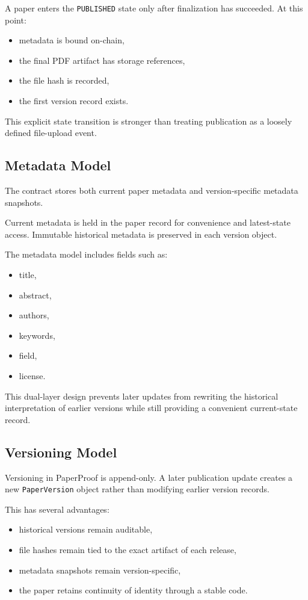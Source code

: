 \documentclass[journal]{IEEEtran}
\begin{document}
A paper enters the \texttt{PUBLISHED} state only after finalization has succeeded. At this point:
\begin{itemize}
    \item metadata is bound on-chain,
    \item the final PDF artifact has storage references,
    \item the file hash is recorded,
    \item the first version record exists.
\end{itemize}


This explicit state transition is stronger than treating publication as a loosely defined file-upload event.

\subsection{Metadata Model}

The contract stores both current paper metadata and version-specific metadata snapshots.

Current metadata is held in the paper record for convenience and latest-state access. Immutable historical metadata is preserved in each version object.

The metadata model includes fields such as:
\begin{itemize}
    \item title,
    \item abstract,
    \item authors,
    \item keywords,
    \item field,
    \item license.
\end{itemize}


This dual-layer design prevents later updates from rewriting the historical interpretation of earlier versions while still providing a convenient current-state record.

\subsection{Versioning Model}

Versioning in PaperProof is append-only. A later publication update creates a new \texttt{PaperVersion} object rather than modifying earlier version records.

This has several advantages:
\begin{itemize}
    \item historical versions remain auditable,
    \item file hashes remain tied to the exact artifact of each release,
    \item metadata snapshots remain version-specific,
    \item the paper retains continuity of identity through a stable code.
\end{itemize}
\end{document}
